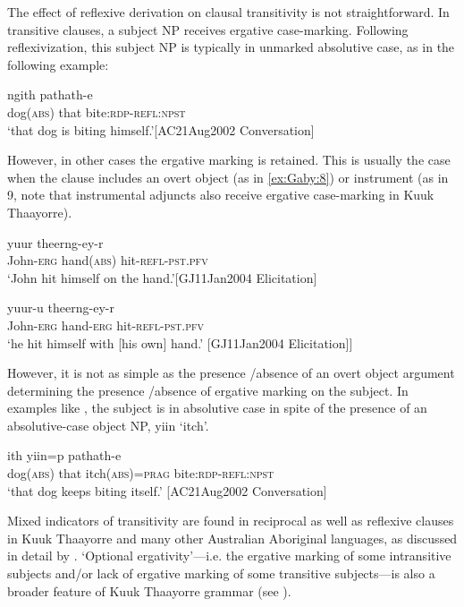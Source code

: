 \documentclass[output=paper]{langscibook}
\begin{document}
The effect of reflexive derivation on clausal transitivity is not straightforward. In transitive clauses, a subject NP receives ergative case-marking. Following reflexivization, this subject NP is typically in unmarked absolutive case, as in the following example: 

\ea 
    \label{ex:Gaby:7}
      {ngith}  {pathath-e}\\
    dog(\textsc{abs})  that  bite:\textsc{rdp-refl:npst}\\
    \glt ‘that dog is biting himself.’[AC21Aug2002 Conversation]
    \z
  
However, in other cases the ergative marking is retained. This is usually the case when the clause includes an overt object (as in \ref{ex:Gaby:8}) or instrument (as in 9, note that instrumental adjuncts also receive ergative case-marking in Kuuk Thaayorre). 

\ea 
    \label{ex:Gaby:8}
      {yuur}  {theerng-ey-r}\\
    John-\textsc{erg}  hand(\textsc{abs)}  hit-\textsc{refl-pst.pfv}\\
    \glt ‘John hit himself on the hand.’[GJ11Jan2004 Elicitation]
    \z


\ea 
    \label{ex:Gaby:9}
      {yuur-u}  {theerng-ey-r} \\
    John-\textsc{erg}  hand-\textsc{erg}  hit-\textsc{refl-pst.pfv}\\
    \glt ‘he hit himself with [his own] hand.’ [GJ11Jan2004 Elicitation]]
    \z


However, it is not as simple as the presence /absence of an overt object argument determining the presence /absence of ergative marking on the subject. In examples like , the subject is in absolutive case in spite of the presence of an absolutive-case object NP, {yiin} ‘itch’. 

\ea 
    \label{ex:Gaby:10}
     {ith} {yiin=p} {pathath-e}\\
    dog(\textsc{abs}) that itch(\textsc{abs})=\textsc{prag}  bite:\textsc{rdp-refl:npst}\\
    \glt  ‘that dog keeps biting itself.’ [AC21Aug2002 Conversation]
    \z

Mixed indicators of transitivity are found in reciprocal as well as reflexive clauses in Kuuk Thaayorre and many other Australian Aboriginal languages, as discussed in detail by \citet{EvansEtAl2007}. ‘Optional ergativity’—i.e. the ergative marking of some intransitive subjects and/or lack of ergative marking of some transitive subjects—is also a broader feature of Kuuk Thaayorre grammar (see \citealt{Gaby2008Discourse, Gaby2010}).
\end{document}

